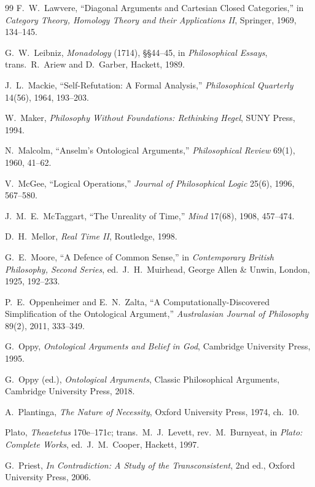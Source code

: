 \documentclass[11pt]{article}
\begin{document}
\begin{thebibliography}{99}
 F.\ W.\ Lawvere, ``Diagonal Arguments and Cartesian Closed Categories,'' in \emph{Category Theory, Homology Theory and their Applications II}, Springer, 1969, 134--145.

 G.\ W.\ Leibniz, \emph{Monadology} (1714), \S\S 44--45, in \emph{Philosophical Essays}, trans.\ R.\ Ariew and D.\ Garber, Hackett, 1989.

 J.\ L.\ Mackie, ``Self-Refutation: A Formal Analysis,'' \emph{Philosophical Quarterly} 14(56), 1964, 193--203.

 W.\ Maker, \emph{Philosophy Without Foundations: Rethinking Hegel}, SUNY Press, 1994.

 N.\ Malcolm, ``Anselm's Ontological Arguments,'' \emph{Philosophical Review} 69(1), 1960, 41--62.

 V.\ McGee, ``Logical Operations,'' \emph{Journal of Philosophical Logic} 25(6), 1996, 567--580.

 J.\ M.\ E.\ McTaggart, ``The Unreality of Time,'' \emph{Mind} 17(68), 1908, 457--474.

 D.\ H.\ Mellor, \emph{Real Time II}, Routledge, 1998.

 G.\ E.\ Moore, ``A Defence of Common Sense,'' in \emph{Contemporary British Philosophy, Second Series}, ed.\ J.\ H.\ Muirhead, George Allen \& Unwin, London, 1925, 192--233.

 P.\ E.\ Oppenheimer and E.\ N.\ Zalta, ``A Computationally-Discovered Simplification of the Ontological Argument,'' \emph{Australasian Journal of Philosophy} 89(2), 2011, 333--349.

 G.\ Oppy, \emph{Ontological Arguments and Belief in God}, Cambridge University Press, 1995.

 G.\ Oppy (ed.), \emph{Ontological Arguments}, Classic Philosophical Arguments, Cambridge University Press, 2018.

 A.\ Plantinga, \emph{The Nature of Necessity}, Oxford University Press, 1974, ch.\ 10.

 Plato, \emph{Theaetetus} 170e--171c; trans.\ M.\ J.\ Levett, rev.\ M.\ Burnyeat, in \emph{Plato: Complete Works}, ed.\ J.\ M.\ Cooper, Hackett, 1997.

 G.\ Priest, \emph{In Contradiction: A Study of the Transconsistent}, 2nd ed., Oxford University Press, 2006.


\end{thebibliography}
\end{document}
